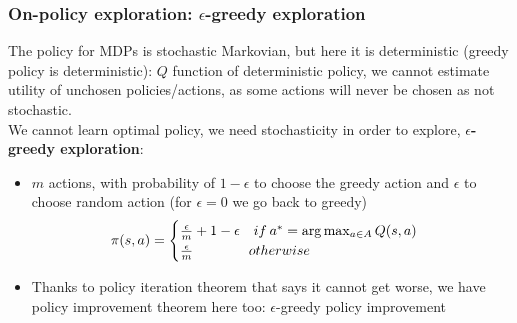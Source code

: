 \subsubsection{On-policy exploration: $\epsilon$-greedy exploration}
    The policy for MDPs is stochastic Markovian, but here it is deterministic (greedy policy is deterministic): $Q$ function of deterministic policy, we cannot estimate utility of unchosen policies/actions, as some actions will never be chosen as not stochastic.\\
    We cannot learn optimal policy, we need stochasticity in order to explore, \textbf{$\epsilon$-greedy exploration}:
    \begin{itemize}
        \item $m$ actions, with probability of $1-\epsilon$ to choose the greedy action and $\epsilon$ to choose random action (for $\epsilon=0$ we go back to greedy)
        $$
        \pi(s,a)=
        \begin{cases}
            \frac{\epsilon}{m}+1-\epsilon\hspace{1em}if\hspace{0.2em}a^*=\arg\max_{a\in A}Q(s,a)\\
            \frac{\epsilon}{m}\hspace{4em}otherwise
        \end{cases}
        $$
        \item Thanks to policy iteration theorem that says it cannot get worse, we have policy improvement theorem here too: $\epsilon$-greedy policy improvement
    \end{itemize}
